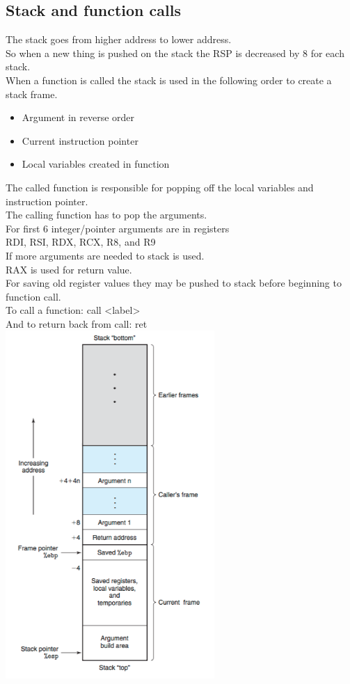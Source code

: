 \documentclass[12pt, a4paper]{article}
\begin{document}
		\subsection{Stack and function calls}
			The stack goes from higher address to lower address.\\
			So when a new thing is pushed on the stack the RSP is decreased by 8 for each stack.\\
			When a function is called the stack is used in the following order to create a stack frame.
			\begin{itemize}
				\item Argument in reverse order
				\item Current instruction pointer 
				\item Local variables created in function
			\end{itemize}
			The called function is responsible for popping off the local variables and instruction pointer.\\
			The calling function has to pop the arguments.\\
			For first 6 integer/pointer arguments are in registers\\
			RDI, RSI, RDX, RCX, R8, and R9\\
			If more arguments are needed to stack is used.\\
			RAX is used for return value.\\
			For saving old register values they may be pushed to stack before beginning to function call.\\
			To call a function: call <label>\\
			And to return back from call: ret\\
			\includegraphics[width=300px]{assets/stackFrameStructure.png}
\end{document}
